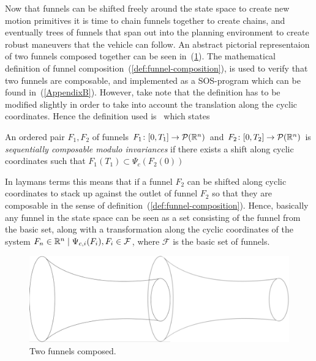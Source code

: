 Now that funnels can be shifted freely around the state space to create new
motion primitives it is time to chain funnels together to create chains, and
eventually trees of funnels that span out into the planning environment to
create robust maneuvers that the vehicle can follow. An abstract pictorial
representaion of two funnels composed together can be seen
in~(\ref{fig:two-funnels-composed}). The mathematical definition of funnel
composition~(\ref{def:funnel-composition}), is used to verify that two funnels
are composable, and implemented as a \ac{SOS}-program which can be found
in~(\ref{AppendixB}). However, take note that the definition has to be modified
slightly in order to take into account the translation along the cyclic
coordinates. Hence the definition used
is~\cite[definition~3,sec~5]{majumdarFunnelLibrariesRealtime2017} which states
\begin{definition}
  An ordered pair \(F_1,F_2\) of funnels \(F_1 \colon [0,T_1] \rightarrow
  \mathcal{P}(\mathbb{R}^n)\) and \(F_2 \colon [0,T_2] \rightarrow \mathcal{P}(\mathbb{R}^n)\)
  is \textit{sequentially composable modulo invariances} if there exists a shift
  along cyclic coordinates such that \(F_{1}(T_1) \subset
  \Psi_{c}\left(F_2(0)\right)\)
\end{definition}
In laymans terms this means that if a funnel \(F_2\) can be shifted along cyclic
coordinates to stack up against the outlet of funnel \(F_2\) so that they are
composable in the sense of definition~(\ref{def:funnel-composition}). Hence,
basically any funnel in the state space can be seen as a set consisting of the
funnel from the basic set, along with a transformation along the cyclic
coordinates of the system \(F_n \in \mathbb{R}^n \mid \Psi_{c,i}(F_i), F_i \in
\mathcal{F}\), where \(\mathcal{F}\) is the basic set of funnels.

\begin{figure}
  \includegraphics[scale=.2]{figures/method/funnel-composition} \centering
  \caption{Two funnels composed.}
  \label{fig:two-funnels-composed}
\end{figure}

